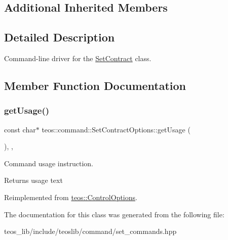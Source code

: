 \subsection*{Additional Inherited Members}


\subsection{Detailed Description}
Command-\/line driver for the \mbox{\hyperlink{classteos_1_1command_1_1_set_contract}{Set\+Contract}} class. 

\subsection{Member Function Documentation}
\mbox{\label{classteos_1_1command_1_1_set_contract_options_a9176e2b58b222d45c975d6e9fa9b4ac7}} 
\subsubsection{\texorpdfstring{get\+Usage()}{getUsage()}}
{\footnotesize\ttfamily const char$\ast$ teos\+::command\+::\+Set\+Contract\+Options\+::get\+Usage (\begin{DoxyParamCaption}{ }\end{DoxyParamCaption})\hspace{0.3cm}{\ttfamily [inline]}, {\ttfamily [protected]}, {\ttfamily [virtual]}}



Command \textquotesingle{}usage\textquotesingle{} instruction. 

\begin{DoxyReturn}{Returns}
usage text 
\end{DoxyReturn}


Reimplemented from \mbox{\hyperlink{classteos_1_1_control_options_a0aa5671f9bc750ed5280c26c543874f3}{teos\+::\+Control\+Options}}.



The documentation for this class was generated from the following file\+:\begin{DoxyCompactItemize}
\item 
teos\+\_\+lib/include/teoslib/command/set\+\_\+commands.\+hpp\end{DoxyCompactItemize}
